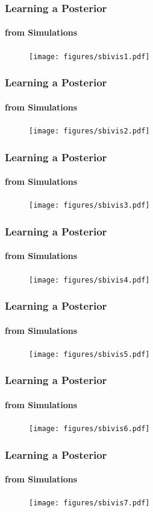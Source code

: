 \documentclass[9pt]{beamer}
\begin{document}
\begin{frame}
\frametitle{Learning a Posterior}
\framesubtitle{from Simulations}
\begin{figure}
	\texttt{[image: figures/sbivis1.pdf]}
\end{figure}
\end{frame} 
\begin{frame}
\frametitle{Learning a Posterior}
\framesubtitle{from Simulations}
\begin{figure}
	\texttt{[image: figures/sbivis2.pdf]}
\end{figure}
\end{frame} \begin{frame}
\frametitle{Learning a Posterior}
\framesubtitle{from Simulations}
\begin{figure}
\texttt{[image: figures/sbivis3.pdf]}
\end{figure}
\end{frame} \begin{frame}
\frametitle{Learning a Posterior}
\framesubtitle{from Simulations}
\begin{figure}
\texttt{[image: figures/sbivis4.pdf]}
\end{figure}
\end{frame} \begin{frame}
\frametitle{Learning a Posterior}
\framesubtitle{from Simulations}
\begin{figure}
\texttt{[image: figures/sbivis5.pdf]}
\end{figure}
\end{frame} \begin{frame}
\frametitle{Learning a Posterior}
\framesubtitle{from Simulations}
\begin{figure}
\texttt{[image: figures/sbivis6.pdf]}
\end{figure}
\end{frame} \begin{frame}
\frametitle{Learning a Posterior}
\framesubtitle{from Simulations}
\begin{figure}
\texttt{[image: figures/sbivis7.pdf]}
\end{figure}
\end{frame} 
\end{document}
